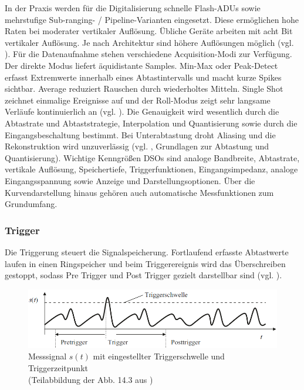 \documentclass[a4paper, portrait, 12pt]{scrartcl} %
\begin{document}
In der Praxis werden für die Digitalisierung schnelle Flash-ADUs sowie mehrstufige Sub-ranging- / Pipeline‑Varianten eingesetzt. Diese ermöglichen hohe Raten bei moderater vertikaler Auflösung. Übliche Geräte arbeiten mit acht Bit vertikaler Auflösung. Je nach Architektur sind höhere Auflösungen möglich (vgl. \cite[S. 114-119]{Bernstein2023}). Für die Datenaufnahme stehen verschiedene Acquisition-Modi zur Verfügung. Der direkte Modus liefert äquidistante Samples. Min-Max oder Peak-Detect erfasst Extremwerte innerhalb eines Abtastintervalls und macht kurze Spikes sichtbar. Average reduziert Rauschen durch wiederholtes Mitteln. Single Shot zeichnet einmalige Ereignisse auf und der Roll-Modus zeigt sehr langsame Verläufe kontinuierlich an (vgl. \cite[S. 220f]{Muehl2020}). Die Genauigkeit wird wesentlich durch die Abtastrate und Abtaststrategie, Interpolation und Quantisierung sowie durch die Eingangsbeschaltung bestimmt. Bei Unterabtastung droht Aliasing und die Rekonstruktion wird unzuverlässig (vgl. \cite[S. ??]{Muehl2020}, Grundlagen zur Abtastung und Quantisierung). Wichtige Kenngrößen DSOs sind analoge Bandbreite, Abtastrate, vertikale Auflösung, Speichertiefe, Triggerfunktionen, Eingangsimpedanz, analoge Eingangsspannung sowie Anzeige und Darstellungsoptionen. Über die Kurvendarstellung hinaus gehören auch automatische Messfunktionen zum Grundumfang.

\subsubsection{Trigger}

Die Triggerung steuert die Signalspeicherung. Fortlaufend erfasste Abtastwerte laufen in einen Ringspeicher und beim Triggerereignis wird das Überschreiben gestoppt, sodass Pre Trigger und Post Trigger gezielt darstellbar sind (vgl. \cite[S. 216f]{Muehl2020}).

\begin{figure}[H]
	\centering
		\includegraphics[scale=0.5]{trigger_oscilloscope_muehl.png} 
		\caption{\centering Messsignal $s(t)$ mit eingestellter Triggerschwelle und Triggerzeitpunkt\\(Teilabbildung der Abb. 14.3 aus \cite[S. 217]{Muehl2020})}
	\label{fig:trigger_oscilloscope}
\end{figure}
\end{document}
